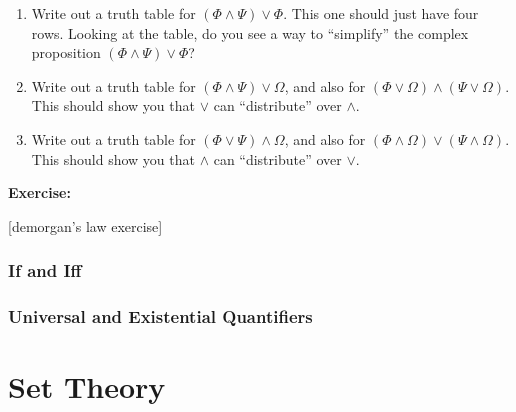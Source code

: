 \documentclass[12pt]{article}
\newcommand{\note}[1]{[#1]}
\newcommand{\AND}{\wedge}
\newcommand{\OR}{\vee}
\newcommand{\ex}[1]{\textbf{Exercise:}\begin{adjustwidth}{2em}{}#1\end{adjustwidth}}
\def\pA{\Phi}
\def\pB{\Psi}
\def\pC{\Omega}
\begin{document}
{\begin{enumerate}
\item
Write out a truth table for $(\pA\AND\pB)\OR\pA$. This one should just have four rows.
Looking at the table, do you see a way to ``simplify'' the complex proposition  $(\pA\AND\pB)\OR\pA$?

\item
Write out a truth table for $(\pA\AND\pB)\OR\pC$, and also for $(\pA\OR\pC)\AND(\pB\OR\pC)$.
This should show you that $\OR$ can ``distribute'' over $\AND$.

\item
Write out a truth table for $(\pA\OR\pB)\AND\pC$, and also for $(\pA\AND\pC)\OR(\pB\AND\pC)$.
This should show you that $\AND$ can ``distribute'' over $\OR$.
\end{enumerate}
}


\ex{
\note{demorgan's law exercise}
}



\subsubsection{If and Iff}



\subsubsection{Universal and Existential Quantifiers}







\section{Set Theory} %
\label{sec:sets}




\end{document}
